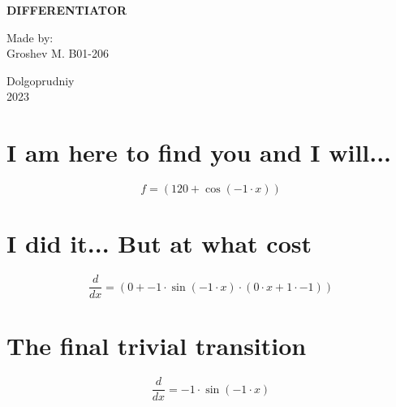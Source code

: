 \documentclass[a4paper, 12pt]{article}
\title{}
\date{}
\begin{document}

    \begin{titlepage}
    \maketitle
    \thispagestyle{empty}

            \begin{center}
                  \Large \textbf{DIFFERENTIATOR}
            \end{center}

             \vspace{20em}
             \begin{flushright}
                 \normalsize Made by: \\
                             Groshev M. B01-206
             \end{flushright}

             \begin{center}
                    \vfill \normalsize Dolgoprudniy \\ 2023
             \end{center}
    \end{titlepage}


\section{I am here to find you and I will...}\begin{equation*}
    f = ({{120}}+{\cos({{{-1}}\cdot{{x}}})})
\end{equation*}

\section{I did it... But at what cost}\begin{equation*}
    \frac{d}{dx} = ({{0}}+{{{{-1}}\cdot{\sin({{{-1}}\cdot{{x}}})}}\cdot{({{{0}}\cdot{{x}}}+{{{1}}\cdot{{-1}}})}})
\end{equation*}

\section{The final trivial transition}\begin{equation*}
    \frac{d}{dx} = {{-1}}\cdot{\sin({{{-1}}\cdot{{x}}})}
\end{equation*}
\end{document}
